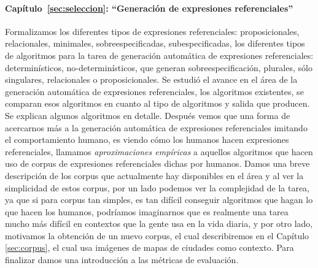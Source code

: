 \paragraph{Cap\'itulo~\ref{sec:seleccion}: ``Generaci\'on de expresiones referenciales''} Formalizamos los diferentes tipos de expresiones referenciales: proposicionales, relacionales, minimales, sobreespecificadas, subespecificadas, los diferentes tipos de algoritmos para la tarea de generaci\'on autom\'atica de expresiones referenciales: determin\'isticos, no-determin\'isticos, que generan sobreespecificaci\'on, 
plurales, s\'olo singulares, relacionales o proposicionales. Se estudi\'o el avance en el \'area de la generaci\'on autom\'atica de expresiones referenciales, los algoritmos existentes, se comparan esos algoritmos en cuanto al tipo de algoritmos y salida que producen. Se explican algunos algoritmos en detalle. 
Despu\'es vemos que una forma de acercarnos m\'as a la generaci\'on autom\'atica de expresiones referenciales  imitando el comportamiento humano, es viendo c\'omo los humanos hacen expresiones referenciales, llamamos {\it aproximaciones emp\'iricas} a aquellos algoritmos que hacen uso de corpus de expresiones referenciales dichas por humanos. Damos una breve descripci\'on de los corpus que actualmente hay disponibles en el \'area y al ver la simplicidad de estos corpus, por un lado podemos ver la complejidad de la tarea, ya que si para corpus tan simples, es tan dif\'icil conseguir algoritmos que hagan lo que hacen los humanos, podr\'iamos imaginarnos que es realmente una tarea mucho m\'as dif\'icil en contextos que la gente usa en la vida diaria, y por otro lado, motivamos la obtenci\'on de un nuevo  corpus, el cual describiremos en el Cap\'itulo \ref{sec:corpus}, el cual usa im\'agenes de mapas de ciudades como contexto. Para finalizar damos una introducci\'on a las m\'etricas de evaluaci\'on. 


